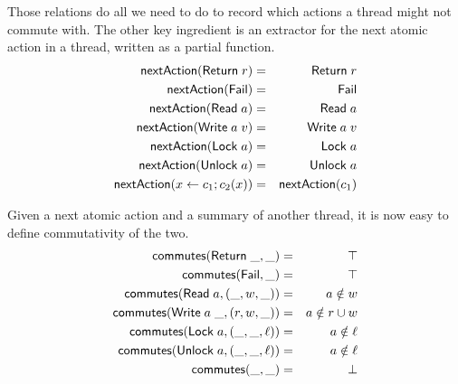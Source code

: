 \documentclass{amsbook}
\theoremstyle{definition}
\theoremstyle{remark}
\numberwithin{section}{chapter}
\numberwithin{equation}{chapter}
\begin{document}
Those relations do all we need to do to record which actions a thread might not commute with.
The other key ingredient is an extractor for the next atomic action in a thread, written as a partial function.
\begin{eqnarray*}
  \mathsf{nextAction}(\mathsf{Return} \; r) &=& \mathsf{Return} \; r \\
  \mathsf{nextAction}(\mathsf{Fail}) &=& \mathsf{Fail} \\
  \mathsf{nextAction}(\mathsf{Read} \; a) &=& \mathsf{Read} \; a \\
  \mathsf{nextAction}(\mathsf{Write} \; a \; v) &=& \mathsf{Write} \; a \; v \\
  \mathsf{nextAction}(\mathsf{Lock} \; a) &=& \mathsf{Lock} \; a \\
  \mathsf{nextAction}(\mathsf{Unlock} \; a) &=& \mathsf{Unlock} \; a \\
  \mathsf{nextAction}(x \leftarrow c_1; c_2(x)) &=& \mathsf{nextAction}(c_1)
\end{eqnarray*}

Given a next atomic action and a summary of another thread, it is now easy to define commutativity of the two.
\newcommand{\commu}[2]{\mt{commutes}(#1, #2)}
\begin{eqnarray*}
  \commu{\mt{Return} \; \_}{\_} &=& \top \\
  \commu{\mt{Fail}}{\_} &=& \top \\
  \commu{\mt{Read} \; a}{(\_, w, \_)} &=& a \notin w \\
  \commu{\mt{Write} \; a \; \_}{(r, w, \_)} &=& a \notin r \cup w \\
  \commu{\mt{Lock} \; a}{(\_, \_, \ell)} &=& a \notin \ell \\
  \commu{\mt{Unlock} \; a}{(\_, \_, \ell)} &=& a \notin \ell \\
  \commu{\_}{\_} &=& \bot
\end{eqnarray*}

\newcommand{\pors}[1]{\mt{porSafe}(#1)}
\end{document}
